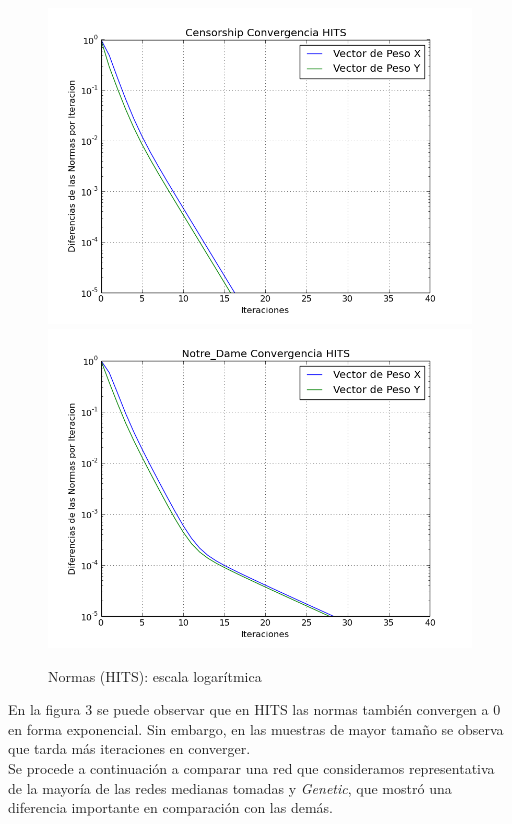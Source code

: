 \documentclass[a4paper]{article}
\begin{document}
\begin{figure}[htbp]
\centering
\includegraphics[scale=0.3]{img/Normas-HITS-Censor.png}
\includegraphics[scale=0.3]{img/Normas-HITS-Notre.png}

\caption{Normas (HITS): escala logarítmica}
\end{figure}

En la figura 3 se puede observar que en HITS las normas también convergen a 0 en forma exponencial. Sin embargo, en las muestras de mayor tamaño se observa que tarda más iteraciones en converger.\\


Se procede a continuación a comparar una red que consideramos representativa de la mayoría de las redes medianas tomadas y \textit{Genetic}, que mostró una diferencia importante en comparación con las demás.
\end{document}
